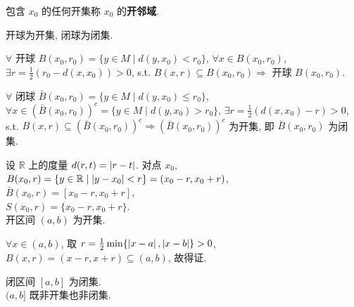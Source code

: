 \documentclass{note}
\begin{document}
\begin{df}[开邻域]
    包含 $x_0$ 的任何开集称 $x_0$ 的\textbf{开邻域}.
\end{df}

开球为开集, 闭球为闭集.
\begin{pf}
    $\forall$ 开球 $B(x_0,r_0)=\{y\in M\mid d(y,x_0)<r_0\}$, $\forall x\in B(x_0,r_0)$, $\exists r=\frac{1}{2}(r_0-d(x,x_0))>0$, s.t. $B(x,r)\subseteq B(x_0,r_0)\Longrightarrow$ 开球 $B(x_0,r_0)$.

    $\forall$ 闭球 $\bar{B}(x_0,r_0)=\{y\in M\mid d(y,x_0)\leq r_0\}$, $\forall x\in(\bar{B}(x_0,r_0))^c=\{y\in M\mid d(y,x_0)>r_0\}$, $\exists r=\frac{1}{2}(d(x,x_0)-r)>0$, s.t. $B(x,r)\subseteq(\bar{B}(x_0,r_0))^c\Longrightarrow(\bar{B}(x_0,r_0))^c$ 为开集, 即 $\bar{B}(x_0,r_0)$ 为闭集.
\end{pf}

\begin{eg}
    设 $\mathbb{R}$ 上的度量 $d(r,t)=\left\lvert r-t\right\rvert$. 对点 $x_0$,\\
    $B(x_0,r)=\{y\in\mathbb{R}\mid\left\lvert y-x_0\right\rvert<r\}=(x_0-r,x_0+r)$,\\
    $\bar{B}(x_0,r)=[x_0-r,x_0+r]$,\\
    $S(x_0,r)=\{x_0-r,x_0+r\}$.\\
    开区间 $(a,b)$ 为开集.
    \begin{pf}
        $\forall x\in(a,b)$, 取 $r=\frac{1}{2}\min\{\left\lvert x-a\right\rvert,\left\lvert x-b\right\rvert\}>0$, $B(x,r)=(x-r,x+r)\subseteq(a,b)$, 故得证.
    \end{pf}
    闭区间 $[a,b]$ 为闭集.\\
    $(a,b]$ 既非开集也非闭集.
\end{eg}
\end{document}

